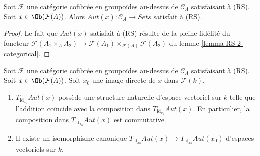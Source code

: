 \begin{lemma}
\label{lemma-Aut-functor-RS}
Soit $\mathcal{F}$ une catégorie cofibrée en groupoïdes au-dessus de
$\mathcal{C}_\Lambda$ satisfaisant à (RS). Soit
$x \in \Ob(\mathcal{F}(A))$. Alors
$\mathit{Aut}(x): \mathcal{C}_A \to \textit{Sets}$ satisfait à (RS).
\end{lemma}

\begin{proof}
Le fait que $\mathit{Aut}(x)$ satisfait à (RS) résulte de la pleine fidélité du
foncteur
$\mathcal{F}(A_1 \times_A A_2) \to
\mathcal{F}(A_1) \times_{\mathcal{F}(A)} \mathcal{F}(A_2)$ du lemme
\ref{lemma-RS-2-categorical}.
\end{proof}

\begin{lemma}
\label{lemma-Aut-functor-tangent-space}
Soit $\mathcal{F}$ une catégorie cofibrée en groupoïdes au-dessus de
$\mathcal{C}_\Lambda$ satisfaisant à (RS). Soit
$x \in \Ob(\mathcal{F}(A))$. Soit $x_0$ une image directe de $x$ dans
$\mathcal{F}(k)$.
\begin{enumerate}
\item $T_{\text{id}_{x_0}} \mathit{Aut}(x)$ possède une structure naturelle
d'espace vectoriel sur $k$ telle que l'addition coïncide avec la composition
dans $T_{\text{id}_{x_0}} \mathit{Aut}(x)$. En particulier, la composition
dans $T_{\text{id}_{x_0}} \mathit{Aut}(x)$ est commutative.
\item Il existe un isomorphisme canonique
$T_{\text{id}_{x_0}} \mathit{Aut}(x) \to
T_{\text{id}_{x_0}} \mathit{Aut}(x_0)$
d'espaces vectoriels sur $k$.
\end{enumerate}
\end{lemma}

